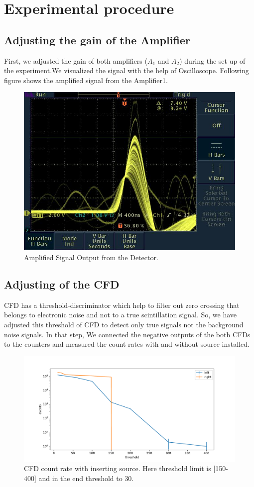 \section{Experimental procedure}
\subsection{Adjusting the gain of the Amplifier}
First, we adjusted the gain of both amplifiers  ($A_{1}$ and  $A_{2}$) during the set up of the experiment.We visualized the signal with the help of Oscilloscope. Following figure shows the amplified signal from the Amplifier1.



\begin{figure}[htbp]
	\centering
	\includegraphics[width=0.8\linewidth]{./figs/amplified.jpg}
	\caption{Amplified Signal Output from the Detector.}%
	\label{fig:angAsymm}
\end{figure}

\subsection{Adjusting of the CFD}
CFD has a threshold-discriminator which help to filter out zero crossing that belongs to electronic noise and not to a true scintillation signal. So, we have adjusted this threshold of CFD to detect only true signals not the background noise signals. In that step, We connected the negative outputs of the both CFDs to the counters and measured the count rates with and without source installed.

\begin{figure}[htbp]
	\centering
	\includegraphics[width=0.8\linewidth]{./figs/cfd.pdf}
	\caption{CFD count rate with inserting source. Here threshold limit is [150-400] and in the end threshold to 30. }%
	\label{fig:angAsymm}
\end{figure}

